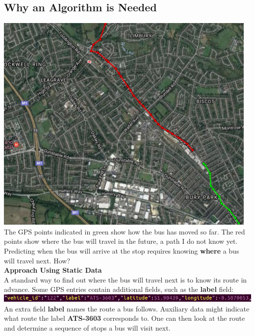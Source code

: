 \documentclass[12pt,a4paper,oneside,openright]{report}
\begin{document}
\subsection{Why an Algorithm is Needed}

\includegraphics[scale=0.8]{figs/route_detector.png} \\

The GPS points indicated in green show how the bus has moved so far.
The red points show where the bus will travel in the future,
a path I do not know yet. Predicting when the bus will arrive at the stop
requires knowing \textbf{where} a bus will travel next. How? \\

\textbf{Approach Using Static Data} \\

A standard way to find out where the bus will travel next is to know its 
route in advance. Some GPS entries contain additional fields,
such as the \textbf{label} field: \\

\includegraphics[width=\textwidth, scale=1.2]{figs/labelled_entry.png} \\

An extra field \textbf{label} names the route a bus follows. Auxiliary
data might indicate what route the label \textbf{ATS-3603} corresponds to.
One can then look at the route and determine a sequence of stops 
a bus will visit next. \\
\end{document}
